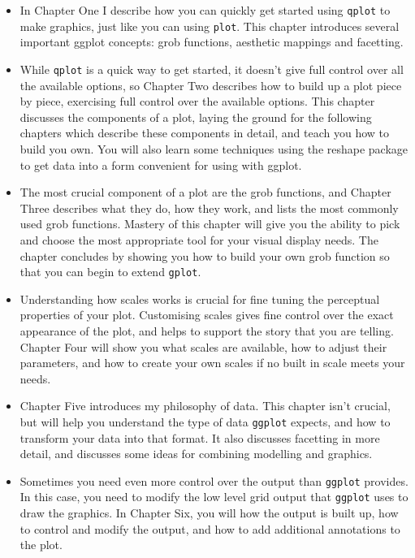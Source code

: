 \begin{itemize}
	\item In Chapter One I describe how you can quickly get started using {\tt qplot} to make graphics, just like you can using {\tt plot}.  This chapter introduces several important ggplot concepts: grob functions, aesthetic mappings and facetting.
	
	\item While {\tt qplot} is a quick way to get started, it doesn't give full control over all the  available options, so Chapter Two describes how to build up a plot piece by piece, exercising full control over the available options.  This chapter discusses the components of a plot, laying the ground for the following chapters which describe these components in detail, and teach you how to build you own.  You will also learn some techniques using the reshape package to get data into a form convenient for using with ggplot.

	\item The most crucial component of a plot are the grob functions, and Chapter Three describes what they do, how they work, and lists the most commonly used grob functions.  Mastery of this chapter will give you the ability to pick and choose the most appropriate tool for your visual display needs.  The chapter concludes by showing you how to build your own grob function so that you can begin to extend {\tt gplot}.

	\item Understanding how scales works is crucial for fine tuning the perceptual properties of your plot.  Customising scales gives fine control over the exact appearance of the plot, and helps to support the story that you are telling.  Chapter Four will show you what scales are available, how to adjust their parameters, and how to create your own scales if no built in scale meets your needs.
	
	\item Chapter Five introduces my philosophy of data.  This chapter isn't crucial, but will help you understand the type of data {\tt ggplot} expects, and how to transform your data into that format.  It also discusses facetting in more detail, and discusses some ideas for combining modelling and graphics.
	
	\item Sometimes you need even more control over the output than {\tt ggplot} provides.  In this case, you need to modify the low level grid output that {\tt ggplot} uses to draw the graphics.  In Chapter Six, you will how the output is built up, how to control and modify the output, and how to add additional annotations to the plot.

\end{itemize}

